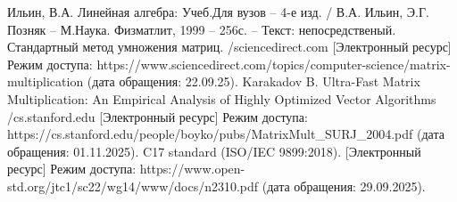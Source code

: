 \begin{thebibliography}{}
	 Ильин, В.А. Линейная алгебра: Учеб.Для вузов -- 4-е изд. / В.А. Ильин, Э.Г. Позняк -- М.Наука. Физматлит, 1999 -- 256с. -- Текст: непосредственый.
	 Стандартный метод умножения матриц. /sciencedirect.com [Электронный ресурс] Режим доступа: https://www.sciencedirect.com/topics/computer-science/matrix-multiplication (дата обращения: 22.09.25).
	 Karakadov B. Ultra-Fast Matrix Multiplication: An Empirical Analysis of Highly Optimized Vector Algorithms /cs.stanford.edu [Электронный ресурс] Режим доступа: https://cs.stanford.edu/people/boyko/pubs/MatrixMult\_SURJ\_2004.pdf (дата обращения: 01.11.2025).
	 C17 standard (ISO/IEC 9899:2018). [Электронный ресурс] Режим доступа: https://www.open-std.org/jtc1/sc22/wg14/www/docs/n2310.pdf (дата обращения: 29.09.2025).
\end{thebibliography}

